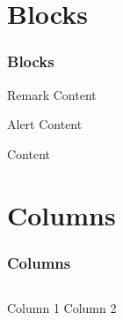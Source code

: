 \documentclass[12pt]{beamer}
\begin{document}
    \section{Blocks}
    \label{sec:blocks}
    \begin{frame}
        \frametitle{Blocks}

        \begin{block}{Remark}
            Content
        \end{block}

        \begin{alertblock}{Alert}
            Content
        \end{alertblock}

        \begin{examples}
            Content
        \end{examples}
    \end{frame}

    \section{Columns}
    \label{sec:columns}
    \begin{frame}
        \frametitle{Columns}

        \begin{columns}
            Column 1
            Column 2
        \end{columns}

    \end{frame}
\end{document}
